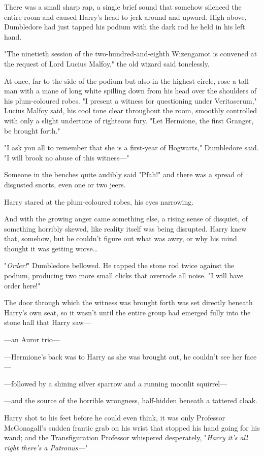 There was a small sharp rap, a single brief sound that somehow silenced the
entire room and caused Harry’s head to jerk around and upward. High above,
Dumbledore had just tapped his podium with the dark rod he held in his left
hand.

"The ninetieth session of the two-hundred-and-eighth Wizengamot is convened at
the request of Lord Lucius Malfoy," the old wizard said tonelessly.

At once, far to the side of the podium but also in the highest circle, rose a
tall man with a mane of long white spilling down from his head over the
shoulders of his plum-coloured robes. "I present a witness for questioning under
Veritaserum," Lucius Malfoy said, his cool tone clear throughout the room,
smoothly controlled with only a slight undertone of righteous fury. "Let
Hermione, the first Granger, be brought forth."

"I ask you all to remember that she is a first-year of Hogwarts," Dumbledore
said. "I will brook no abuse of this witness—"

Someone in the benches quite audibly said "Pfah!" and there was a spread of
disgusted snorts, even one or two jeers.

Harry stared at the plum-coloured robes, his eyes narrowing.

And with the growing anger came something else, a rising sense of disquiet, of
something horribly skewed, like reality itself was being disrupted. Harry knew
that, somehow, but he couldn’t figure out what was awry, or why his mind
thought it was getting worse…

"\emph{Order!}" Dumbledore bellowed. He rapped the stone rod twice against the
podium, producing two more small clicks that overrode all noise. "I will have
order here!"

The door through which the witness was brought forth was set directly beneath
Harry’s own seat, so it wasn’t until the entire group had emerged fully into
the stone hall that Harry saw—

—an Auror trio—

—Hermione’s back was to Harry as she was brought out, he couldn’t see her
face—

—followed by a shining silver sparrow and a running moonlit squirrel—

—and the source of the horrible wrongness, half-hidden beneath a tattered
cloak.

Harry shot to his feet before he could even think, it was only Professor
McGonagall’s sudden frantic grab on his wrist that stopped his hand going for
his wand; and the Transfiguration Professor whispered desperately, "\emph{Harry
it’s all right there’s a Patronus—}"

